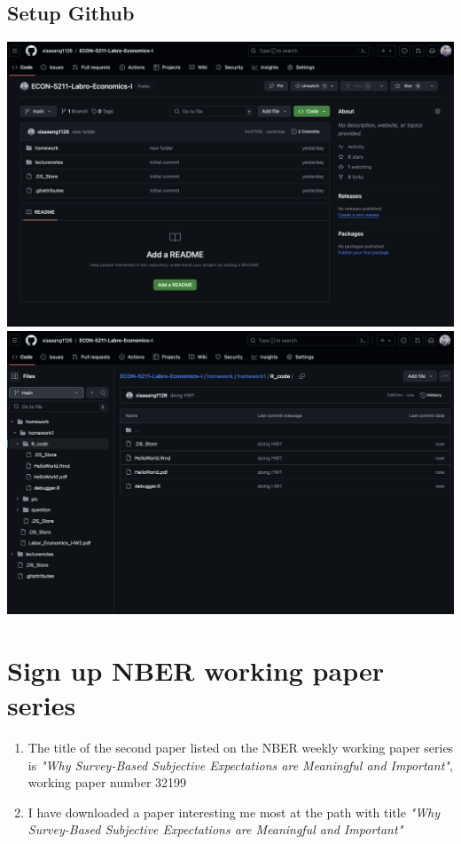 \documentclass[11pt]{article}
\begin{document}
    \subsection{Setup Github}
        \includegraphics[scale = 0.35]{Q1_4_2_createGithub.png} 
        \newline
        \includegraphics[scale = 0.35]{Q1_4_4_pushfile.png}
    


\section{Sign up NBER working paper series}

    \begin{enumerate}

        \item The title of the second paper listed on the NBER weekly working paper series is \textit{"Why Survey-Based Subjective Expectations are Meaningful and Important"}, working paper number 32199
        
        \item I have downloaded a paper interesting me most at the path  with title \textit{"Why Survey-Based Subjective Expectations are Meaningful and Important"}

    \end{enumerate}
\end{document}
